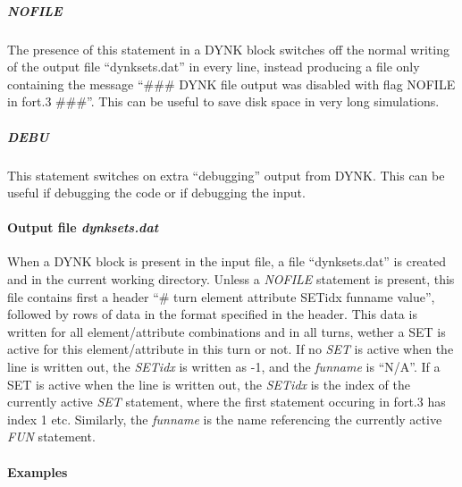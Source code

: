 \documentclass[a4paper,11pt]{report}
\begin{document}
\begin{table}
\begin{center}
\begin{tabular}{|l | l l p{6cm}|}
  \hline

\end{tabular}
\end{center}
\end{table}

\subparagraph{NOFILE}
The presence of this statement in a DYNK block switches off the normal writing of the output file ``dynksets.dat'' in every line, instead producing a file only containing the message ``\#\#\# DYNK file output was disabled with flag NOFILE in fort.3 \#\#\#''.
This can be useful to save disk space in very long simulations.

\subparagraph{DEBU}
This statement switches on extra ``debugging'' output from DYNK.
This can be useful if debugging the code or if debugging the input.

\paragraph{Output file \emph{dynksets.dat}}
When a DYNK block is present in the input file, a file ``dynksets.dat'' is created and in the current working directory.
Unless a \emph{NOFILE} statement is present, this file contains first a header ``\# turn element attribute SETidx funname value'', followed by rows of data in the format specified in the header.
This data is written for all element/attribute combinations and in all turns, wether a SET is active for this element/attribute in this turn or not.
If no \emph{SET} is active when the line is written out, the \emph{SETidx} is written as -1, and the \emph{funname} is ``N/A''.
If a SET is active when the line is written out, the \emph{SETidx} is the index of the currently active \emph{SET} statement, where the first statement occuring in fort.3 has index 1 etc.
Similarly, the \emph{funname} is the name referencing the currently active \emph{FUN} statement.

\paragraph{Examples}
\end{document}
